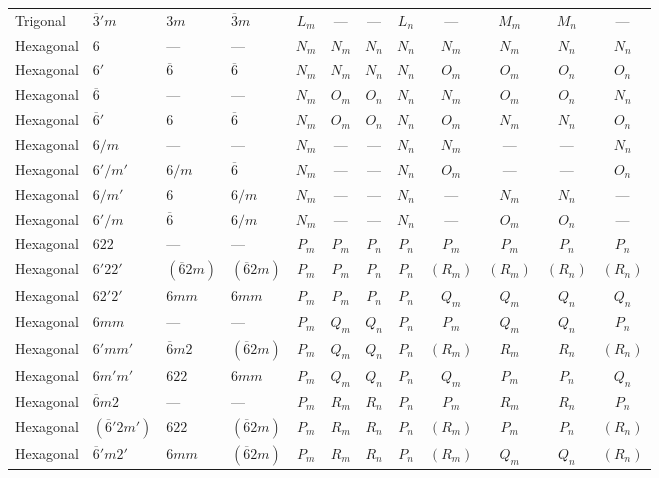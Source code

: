 \documentclass[a4paper,11pt]{article}
\newcommand{\ob}[1]{\overline{#1}}
\begin{document}
\begin{landscape}
\begin{longtable}{l l l l *{4}{c} *{4}{c}}
Trigonal & $\ob{3}'m$ & $3m$ & $\ob{3}m$ & $L_m$ & --- & --- & $L_n$ & --- & $M_m$ & $M_n$ & --- \\
\newpage
Hexagonal & $6$ & --- & --- & $N_m$ & $N_m$ & $N_n$ & $N_n$ & $N_m$ & $N_m$ & $N_n$ & $N_n$ \\
Hexagonal & $6'$ & $\ob{6}$ & $\ob{6}$ & $N_m$ & $N_m$ & $N_n$ & $N_n$ & $O_m$ & $O_m$ & $O_n$ & $O_n$ \\
Hexagonal & $\ob{6}$ & --- & --- & $N_m$ & $O_m$ & $O_n$ & $N_n$ & $N_m$ & $O_m$ & $O_n$ & $N_n$ \\
Hexagonal & $\ob{6}'$ & $6$ & $\ob{6}$ & $N_m$ & $O_m$ & $O_n$ & $N_n$ & $O_m$ & $N_m$ & $N_n$ & $O_n$ \\
Hexagonal & $6/m$ & --- & --- & $N_m$ & --- & --- & $N_n$ & $N_m$ & --- & --- & $N_n$ \\
Hexagonal & $6'/m'$ & $6/m$ & $\ob{6}$ & $N_m$ & --- & --- & $N_n$ & $O_m$ & --- & --- & $O_n$ \\
Hexagonal & $6/m'$ & $6$ & $6/m$ & $N_m$ & --- & --- & $N_n$ & --- & $N_m$ & $N_n$ & --- \\
Hexagonal & $6'/m$ & $\ob{6}$ & $6/m$ & $N_m$ & --- & --- & $N_n$ & --- & $O_m$ & $O_n$ & --- \\
Hexagonal & $622$ & --- & --- & $P_m$ & $P_m$ & $P_n$ & $P_n$ & $P_m$ & $P_m$ & $P_n$ & $P_n$ \\
Hexagonal & $6'22'$ & $(\ob{6}2m)$ & $(\ob{6}2m)$ & $P_m$ & $P_m$ & $P_n$ & $P_n$ & $(R_m)$ & $(R_m)$ & $(R_n)$ & $(R_n)$ \\
Hexagonal & $62'2'$ & $6mm$ & $6mm$ & $P_m$ & $P_m$ & $P_n$ & $P_n$ & $Q_m$ & $Q_m$ & $Q_n$ & $Q_n$ \\
Hexagonal & $6mm$ & --- & --- & $P_m$ & $Q_m$ & $Q_n$ & $P_n$ & $P_m$ & $Q_m$ & $Q_n$ & $P_n$ \\
Hexagonal & $6'mm'$ & $\ob{6}m2$ & $(\ob{6}2m)$ & $P_m$ & $Q_m$ & $Q_n$ & $P_n$ & $(R_m)$ & $R_m$ & $R_n$ & $(R_n)$ \\
Hexagonal & $6m'm'$ & $622$ & $6mm$ & $P_m$ & $Q_m$ & $Q_n$ & $P_n$ & $Q_m$ & $P_m$ & $P_n$ & $Q_n$ \\
Hexagonal & $\ob{6}m2$ & --- & --- & $P_m$ & $R_m$ & $R_n$ & $P_n$ & $P_m$ & $R_m$ & $R_n$ & $P_n$ \\
Hexagonal & $(\ob{6}'2m')$ & $622$ & $(\ob{6}2m)$ & $P_m$ & $R_m$ & $R_n$ & $P_n$ & $(R_m)$ & $P_m$ & $P_n$ & $(R_n)$ \\
Hexagonal & $\ob{6}'m2'$ & $6mm$ & $(\ob{6}2m)$ & $P_m$ & $R_m$ & $R_n$ & $P_n$ & $(R_m)$ & $Q_m$ & $Q_n$ & $(R_n)$ \\

\end{longtable}
\end{landscape}
\end{document}
